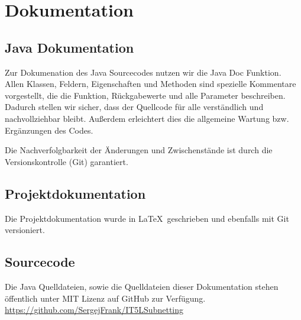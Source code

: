 \section{Dokumentation}

\subsection{Java Dokumentation}
Zur Dokumenation des Java Sourcecodes nutzen wir die Java Doc Funktion. Allen Klassen, Feldern,
Eigenschaften und Methoden sind spezielle Kommentare vorgestellt, die die Funktion, Rückgabewerte
und alle Parameter beschreiben. Dadurch stellen wir sicher, dass der Quellcode für alle verständlich und
nachvollziehbar bleibt. Außerdem erleichtert dies die allgemeine Wartung bzw. Ergänzungen des Codes.

Die Nachverfolgbarkeit der Änderungen und Zwischenstände ist durch die Versionskontrolle (Git) garantiert.

\subsection{Projektdokumentation}
Die Projektdokumentation wurde in \LaTeX\  geschrieben und ebenfalls mit Git versioniert. 

\subsection{Sourcecode}
Die Java Quelldateien, sowie die Quelldateien dieser Dokumentation stehen öffentlich unter MIT Lizenz
auf GitHub zur Verfügung.
\url{https://github.com/SergejFrank/IT5LSubnetting}